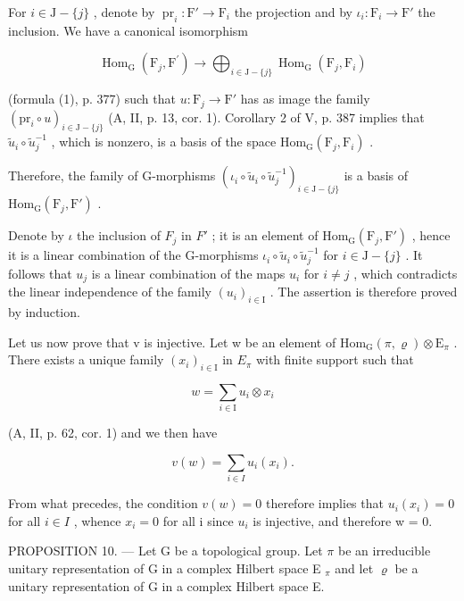 For \(i \in \mathrm{J} - \{j\}\) , denote by \(\operatorname{pr}_i: \mathrm{F}' \to \mathrm{F}_i\) the projection and by \(\iota_i: \mathrm{F}_i \to \mathrm{F}'\) the inclusion. We have a canonical isomorphism

\[
\operatorname{Hom} _ {\mathrm{G}} \left(\mathrm{F} _ {j}, \mathrm{F} ^ {\prime}\right)\rightarrow \bigoplus_ {i \in \mathrm{J} - \{j \}} \operatorname{Hom} _ {\mathrm{G}} \left(\mathrm{F} _ {j}, \mathrm{F} _ {i}\right)
\]

(formula (1), p. 377) such that \(u \colon \mathrm{F}_j \to \mathrm{F}'\) has as image the family \((\mathrm{pr}_i \circ u)_{i \in \mathrm{J} - \{j\}}\) (A, II, p. 13, cor. 1). Corollary 2 of V, p. 387 implies that \(\widetilde{u}_i \circ \widetilde{u}_j^{-1}\) , which is nonzero, is a basis of the space \(\mathrm{Hom}_{\mathrm{G}}(\mathrm{F}_j, \mathrm{F}_i)\) .

Therefore, the family of G-morphisms \((\iota_{i} \circ \widetilde{u}_{i} \circ \widetilde{u}_{j}^{-1})_{i \in \mathrm{J} - \{j\}}\) is a basis of \(\mathrm{Hom}_{\mathrm{G}}(\mathrm{F}_{j}, \mathrm{F}')\) .

Denote by \(\iota\) the inclusion of \(F_{j}\) in \(F'\) ; it is an element of \(\mathrm{Hom}_{\mathrm{G}}(\mathrm{F}_{j}, \mathrm{F}')\) , hence it is a linear combination of the G-morphisms \(\iota_{i} \circ \widetilde{u}_{i} \circ \widetilde{u}_{j}^{-1}\) for \(i \in \mathrm{J} - \{j\}\) . It follows that \(u_{j}\) is a linear combination of the maps \(u_{i}\) for \(i \neq j\) , which contradicts the linear independence of the family \((u_{i})_{i \in \mathrm{I}}\) . The assertion is therefore proved by induction.

Let us now prove that v is injective. Let w be an element of \(\mathrm{Hom}_{\mathrm{G}}(\pi,\varrho)\otimes\mathrm{E}_{\pi}\) . There exists a unique family \((x_{i})_{i\in\mathrm{I}}\) in \(E_{\pi}\) with finite support such that

\[
w = \sum_ {i \in \mathrm{I}} u _ {i} \otimes x _ {i}
\]

(A, II, p. 62, cor. 1) and we then have

\[
v (w) = \sum_ {i \in I} u _ {i} (x _ {i}).
\]

From what precedes, the condition \(v(w) = 0\) therefore implies that \(u_{i}(x_{i}) = 0\) for all \(i \in I\) , whence \(x_{i} = 0\) for all i since \(u_{i}\) is injective, and therefore w = 0.

PROPOSITION 10. --- Let G be a topological group. Let \(\pi\) be an irreducible unitary representation of G in a complex Hilbert space E \(_{\pi}\) and let \(\varrho\) be a unitary representation of G in a complex Hilbert space E.

